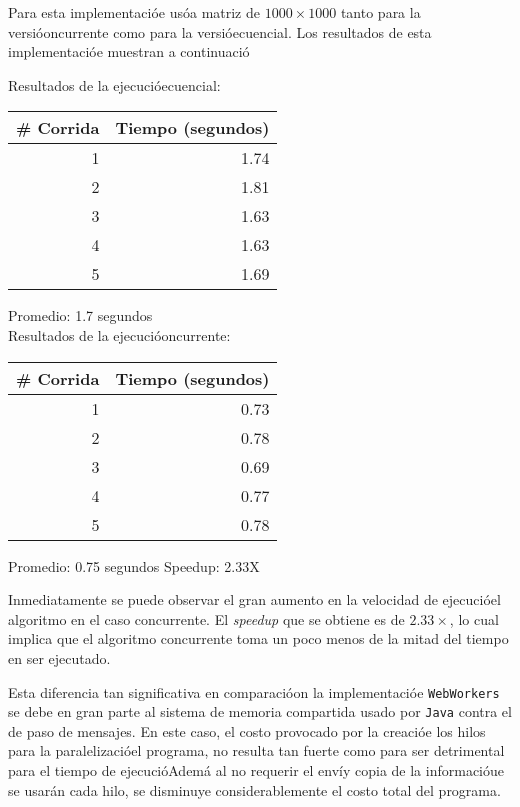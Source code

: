 \documentclass[10pt,letterpaper,oneside]{article}
\begin{document}
{Para esta implementacióe usóa matriz de $1000\times1000$ tanto para la versióoncurrente como para la versióecuencial. Los resultados de esta implementacióe muestran a continuació
\begin{center}

    Resultados de la ejecucióecuencial:
    
    \begin{tabular}{|r|r|}
    \hline
    \hline
    \# Corrida & Tiempo (segundos)  \\
    \hline
    \hline
    1 & 1.74 \\
    2 & 1.81 \\
    3 & 1.63 \\
    4 & 1.63 \\
    5 & 1.69 \\
    \hline
    \end{tabular}
    
    Promedio: 1.7 segundos\\
    \medskip
    \medskip
    \medskip
    Resultados de la ejecucióoncurrente:
    
    \begin{tabular}{|r|r|}
    \hline
    \hline
    \# Corrida & Tiempo (segundos)  \\
    \hline
    \hline
    1 & 0.73 \\
    2 & 0.78 \\
    3 & 0.69\\
    4 & 0.77 \\
    5 & 0.78 \\
    \hline
    \end{tabular}
    
    Promedio: 0.75 segundos
    \medskip
    \medskip
    \medskip
    Speedup: 2.33X
    
\end{center}

Inmediatamente se puede observar el gran aumento en la velocidad de ejecucióel algoritmo en el caso concurrente. El \emph{speedup} que se obtiene es de $2.33\times$, lo cual implica que el algoritmo concurrente toma un poco menos de la mitad del tiempo en ser ejecutado.

Esta diferencia tan significativa en comparacióon la implementacióe \verb!WebWorkers! se debe en gran parte al sistema de memoria compartida usado por \verb!Java! contra el de paso de mensajes. En este caso, el costo provocado por la creacióe los hilos para la paralelizacióel programa, no resulta tan fuerte como para ser detrimental para el tiempo de ejecucióAdemá al no requerir el envíy copia de la informacióue se usarán cada hilo, se disminuye considerablemente el costo total del programa.

}
\end{document}

